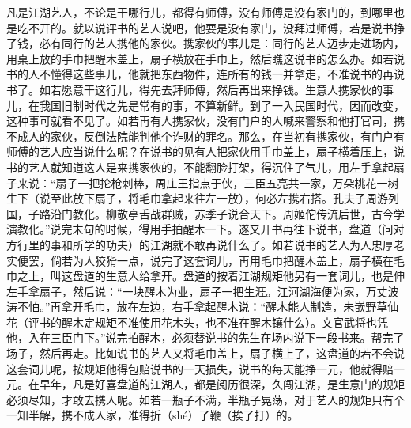 \documentclass[12pt,UTF8]{ctexbook}
\begin{document}
凡是江湖艺人，不论是干哪行儿，都得有师傅，没有师傅是没有家门的，到哪里也是吃不开的。就以说评书的艺人说吧，他要是没有家门，没拜过师傅，若是说书挣了钱，必有同行的艺人携他的家伙。携家伙的事儿是：同行的艺人迈步走进场内，用桌上放的手巾把醒木盖上，扇子横放在手巾上，然后瞧这说书的怎么办。如若说书的人不懂得这些事儿，他就把东西物件，连所有的钱一并拿走，不准说书的再说书了。如若愿意干这行儿，得先去拜师傅，然后再出来挣钱。生意人携家伙的事儿，在我国旧制时代之先是常有的事，不算新鲜。到了一入民国时代，因而改变，这种事可就看不见了。如若再有人携家伙，没有门户的人喊来警察和他打官司，携不成人的家伙，反倒法院能判他个诈财的罪名。那么，在当初有携家伙，有门户有师傅的艺人应当说什么呢？在说书的见有人把家伙用手巾盖上，扇子横着压上，说书的艺人就知道这人是来携家伙的，不能翻脸打架，得沉住了气儿，用左手拿起扇子来说：“扇子一把抡枪刺棒，周庄王指点于侠，三臣五亮共一家，万朵桃花一树生下（说至此放下扇子，将毛巾拿起来往左一放），何必左携右搭。孔夫子周游列国，子路沿门教化。柳敬亭舌战群贼，苏季子说合天下。周姬佗传流后世，古今学演教化。”说完末句的时候，得用手拍醒木一下。遂又开书再往下说书，盘道（问对方行里的事和所学的功夫）的江湖就不敢再说什么了。如若说书的艺人为人忠厚老实便罢，倘若为人狡猾一点，说完了这套词儿，再用毛巾把醒木盖上，扇子横在毛巾之上，叫这盘道的生意人给拿开。盘道的按着江湖规矩他另有一套词儿，也是伸左手拿扇子，然后说：“一块醒木为业，扇子一把生涯。江河湖海便为家，万丈波涛不怕。”再拿开毛巾，放在左边，右手拿起醒木说：“醒木能人制造，未嵌野草仙花（评书的醒木定规矩不准使用花木头，也不准在醒木镶什么）。文官武将也凭他，入在三臣门下。”说完拍醒木，必须替说书的先生在场内说下一段书来。帮完了场子，然后再走。比如说书的艺人又将毛巾盖上，扇子横上了，这盘道的若不会说这套词儿呢，按规矩他得包赔说书的一天损失，说书的每天能挣一元，他就得赔一元。在早年，凡是好喜盘道的江湖人，都是阅历很深，久闯江湖，是生意门的规矩必须尽知，才敢去携人呢。如若一瓶子不满，半瓶子晃荡，对于艺人的规矩只有个一知半解，携不成人家，准得折（shé）了鞭（挨了打）的。
\end{document}
